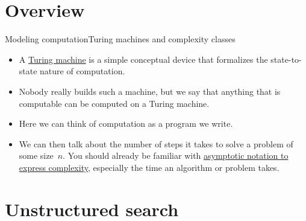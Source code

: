 
\section{Overview}

\begin{frame}{Modeling computation}{Turing machines and complexity classes}
\begin{itemize}
    \item A \href{https://en.wikipedia.org/wiki/Turing_machine}{Turing machine} is a simple conceptual device that formalizes the state-to-state nature of computation.
    \item Nobody really builds such a machine, but we say that anything that is computable can be computed on a Turing machine.   
    \item<3-> Here we can think of computation as a program we write. 
    \item<4-> We can then talk about the number of steps it takes to solve a problem of some size~$n$.  You should already be familiar with \href{https://en.wikipedia.org/wiki/Asymptotic_computational_complexity}{asymptotic notation to express complexity}, especially the time an algorithm or problem takes.
\end{itemize}

    
\end{frame}

\section*{Unstructured search}

